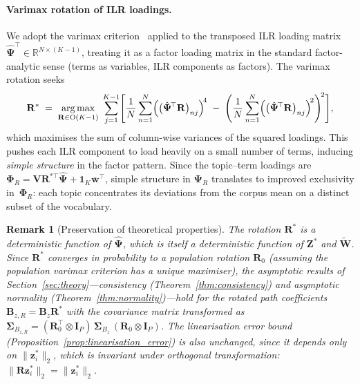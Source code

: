 \documentclass{article}
\newtheorem{remark}{Remark}
\begin{document}
\paragraph{Varimax rotation of ILR loadings.}
We adopt the varimax criterion~\citep{kaiser1958varimax} applied to
the transposed ILR loading matrix
$\hat{\boldsymbol{\Psi}}^{\!\top}\in\mathbb{R}^{N\times(K-1)}$,
treating it as a factor loading matrix in the standard factor-analytic
sense (terms as variables, ILR components as factors). The varimax
rotation seeks
\begin{equation}
  \mathbf{R}^*
  \;=\;
  \operatorname*{arg\,max}_{\mathbf{R}\in\mathrm{O}(K-1)}\;
  \sum_{j=1}^{K-1}
  \Biggl[
    \frac{1}{N}\sum_{n=1}^{N}
    \Bigl(\bigl(\hat{\boldsymbol{\Psi}}^{\!\top}\mathbf{R}\bigr)_{nj}
    \Bigr)^{\!4}
    \;-\;
    \Biggl(
      \frac{1}{N}\sum_{n=1}^{N}
      \Bigl(\bigl(\hat{\boldsymbol{\Psi}}^{\!\top}\mathbf{R}\bigr)_{nj}
      \Bigr)^{\!2}
    \Biggr)^{\!2}
  \Biggr],
  \label{eq:varimax}
\end{equation}
which maximises the sum of column-wise variances of the squared
loadings. This pushes each ILR component to load heavily on a small
number of terms, inducing \emph{simple structure} in the factor
pattern. Since the topic--term loadings are
$\boldsymbol{\Phi}_R = \mathbf{V}\mathbf{R}^{*\top}
\hat{\boldsymbol{\Psi}} + \mathbf{1}_K\bar{\mathbf{w}}^{\!\top}$,
simple structure in $\boldsymbol{\Psi}_R$ translates to improved
exclusivity in~$\boldsymbol{\Phi}_R$: each topic concentrates its
deviations from the corpus mean on a distinct subset of the
vocabulary.
 
\begin{remark}[Preservation of theoretical properties]
\label{rem:rotation_theory}
The rotation $\mathbf{R}^*$ is a deterministic function of
$\hat{\boldsymbol{\Psi}}$, which is itself a deterministic function
of $\mathbf{Z}^*$ and $\widetilde{\mathbf{W}}$. Since
$\mathbf{R}^*$ converges in probability to a population rotation
$\mathbf{R}_0$ (assuming the population varimax criterion has a unique
maximiser), the asymptotic results of
Section~\ref{sec:theory}---consistency
(Theorem~\ref{thm:consistency}) and asymptotic normality
(Theorem~\ref{thm:normality})---hold for the rotated path
coefficients $\mathbf{B}_{z,R} = \hat{\mathbf{B}}_z\mathbf{R}^*$
with the covariance matrix transformed as
$\boldsymbol{\Sigma}_{B_{z,R}}
 = (\mathbf{R}_0^{\!\top}\otimes\mathbf{I}_P)\,
   \boldsymbol{\Sigma}_{B_z}\,
   (\mathbf{R}_0\otimes\mathbf{I}_P)$.
The linearisation error bound
(Proposition~\ref{prop:linearisation_error}) is also
unchanged, since it depends only on $\|\mathbf{z}_i^*\|_2$, which is
invariant under orthogonal transformation:
$\|\mathbf{R}\mathbf{z}_i^*\|_2 = \|\mathbf{z}_i^*\|_2$.
\end{remark}
 
\end{document}
